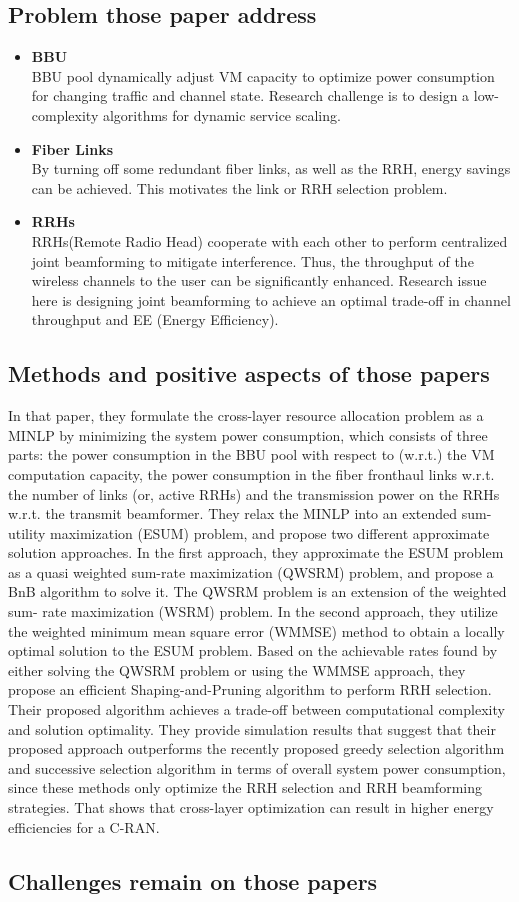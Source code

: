 \documentclass[paper=a4paper,12pt]{article}
\begin{document}
\subsection{Problem those paper address}
\begin{itemize}
  \item \textbf{BBU}\\
    BBU pool dynamically adjust VM capacity to optimize power consumption for changing traffic and channel state. Research challenge is to design a low-complexity algorithms for dynamic service scaling.
  \item \textbf{Fiber Links}\\
    By turning off some redundant fiber links, as well as the RRH, energy savings can be achieved. This motivates the link or RRH selection problem.
  \item \textbf{RRHs}\\
    RRHs(Remote Radio Head) cooperate with each other to perform centralized joint beamforming to mitigate interference. Thus, the throughput of the wireless channels to the user can be significantly enhanced. Research issue here is designing joint beamforming to achieve an optimal trade-off in channel throughput and EE (Energy Efficiency).
\end{itemize}
\subsection{Methods and positive aspects of those papers}
In that paper, they formulate the cross-layer resource allocation problem as a MINLP by minimizing the system power consumption, which consists of three parts: the power consumption in the BBU pool with respect to (w.r.t.) the VM computation capacity, the power consumption in the fiber fronthaul links w.r.t. the number of links (or, active RRHs) and the transmission power on the RRHs w.r.t. the transmit beamformer. They relax the MINLP into an extended sum-utility maximization (ESUM) problem, and propose two different approximate solution approaches. In the first approach, they approximate the ESUM problem as a quasi weighted sum-rate maximization (QWSRM) problem, and propose a BnB algorithm to solve it. The QWSRM problem is an extension of the weighted sum- rate maximization (WSRM) problem. In the second approach, they utilize the weighted minimum mean square error (WMMSE) method to obtain a locally optimal solution to the ESUM problem. Based on the achievable rates found by either solving the QWSRM problem or using the WMMSE approach, they propose an efficient Shaping-and-Pruning algorithm to perform RRH selection. Their proposed algorithm achieves a trade-off between computational complexity and solution optimality. They provide simulation results that suggest that their proposed approach outperforms the recently proposed greedy selection algorithm and successive selection algorithm in terms of overall system power consumption, since these methods only optimize the RRH selection and RRH beamforming strategies. That shows that cross-layer optimization can result in higher energy efficiencies for a C-RAN.
\subsection{Challenges remain on those papers}
\end{document}
